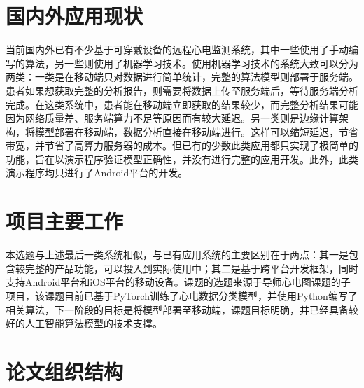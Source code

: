 \documentclass{ecnuthesis}
\begin{document}
    \section{国内外应用现状}\label{sec:status}
    当前国内外已有不少基于可穿戴设备的远程心电监测系统，其中一些使用了手动编写的算法\cite{zhengJiyukechuandaishebeideyidongjianhuAPP2019,wuYidongxindianjiancexitongdeyanjiuyushixian2018,chenYidongxindianxinxijianhuxitongjixindianjiancesuanfadeyanjiu2018,heJiyuyidongpingtaidexindianjianceyiliaoxitongdeshixian2017,gradlRealtimeECGMonitoring2012,wenRealtimeECGTelemonitoring2008}，另一些则使用了机器学习技术。使用机器学习技术的系统大致可以分为两类：一类是在移动端只对数据进行简单统计，完整的算法模型则部署于服务端\cite{wangJiyushenduxuexideyidongyuanchengxindianjiancexitongshejiyushixian2020,singhSmartECGMonitoring2022}。患者如果想获取完整的分析报告，则需要将数据上传至服务端后，等待服务端分析完成。在这类系统中，患者能在移动端立即获取的结果较少，而完整分析结果可能因为网络质量差、服务端算力不足等原因而有较大延迟。另一类则是边缘计算架构，将模型部署在移动端，数据分析直接在移动端进行\cite{chenJiyushenduxuexidexindianfenximoxingdeshejiyuyouhua2021,liuJiyuyidongzhongduanfenxidekechuandairouxingxindianjiancexitong2021,wangEnablingSmartPersonalized2014,jinPredictingCardiovascularDisease2009}。这样可以缩短延迟，节省带宽，并节省了高算力服务器的成本。但已有的少数此类应用都只实现了极简单的功能，旨在以演示程序验证模型正确性，并没有进行完整的应用开发。此外，此类演示程序均只进行了Android平台的开发。


    \section{项目主要工作}\label{sec:work}
    本选题与上述最后一类系统相似，与已有应用系统的主要区别在于两点：其一是包含较完整的产品功能，可以投入到实际使用中；其二是基于跨平台开发框架，同时支持Android平台和iOS平台的移动设备。课题的选题来源于导师心电图课题的子项目，该课题目前已基于PyTorch训练了心电数据分类模型，并使用Python编写了相关算法，下一阶段的目标是将模型部署至移动端，课题目标明确，并已经具备较好的人工智能算法模型的技术支撑。


    \section{论文组织结构}\label{sec:structure}
\end{document}
